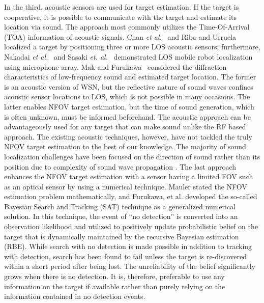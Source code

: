 In the third, acoustic sensors are used for target estimation.  If the target is cooperative, it is possible to communicate with the target and estimate its location via sound.  The approach most commonly utilizes the Time-Of-Arrival (TOA) information of acoustic signals. Chan \textit{et al.}~\cite{cha06} and Riba and Urruela~\cite{rib05} localized a target by positioning three or more LOS acoustic sensors; furthermore, Nakadai \textit{et al.}~\cite{nakadai06} and Sasaki \textit{et. al.}~\cite{sasaki09} demonstrated LOS mobile robot localization using microphone array. Mak and Furukawa~\cite{Mak2009} considered the diffraction characteristics of low-frequency sound and estimated target location.  The former is an acoustic version of WSN, but the reflective nature of sound waves confines acoustic sensor locations to LOS, which is not possible in many occasions.  The latter enables NFOV target estimation, but the time of sound generation, which is often unknown, must be informed beforehand.  The acoustic approach can be advantageously used for any target that can make sound unlike the RF based approach.  The existing acoustic techniques, however, have not tackled the truly NFOV target estimation to the best of our knowledge.  The majority of sound localization challenges have been focused on the direction of sound rather than its position due to complexity of sound wave propagation \cite{mic03,sva12,lu10}.  
The last approach enhances the NFOV target estimation with a sensor having a limited FOV such as an optical sensor by using a numerical technique.  Mauler \cite{mau03} stated the NFOV estimation problem mathematically, and Furukawa, et al. \cite{fur06,fur12} developed the so-called Bayesian Search and Tracking (SAT) technique as a generalized numerical solution.  In this technique, the event of ``no detection'' is converted into an observation likelihood and utilized to positively update probabilistic belief on the target that is dynamically maintained by the recursive Bayesian estimation (RBE).  While search with no detection is made possible in addition to tracking with detection, search has been found to fail unless the target is re-discovered within a short period after being lost.  The unreliability of the belief significantly grows when there is no detection.  It is, therefore, preferable to use any information on the target if available rather than purely relying on the information contained in no detection events.
  
